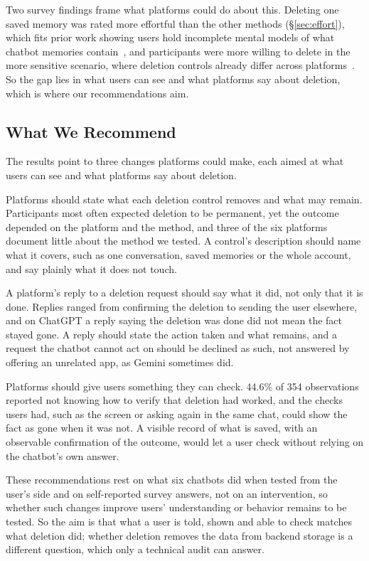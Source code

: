 \documentclass[conference,compsoc]{IEEEtran}
\begin{document}
Two survey findings frame what platforms could do about this.
Deleting one saved memory was rated more effortful than the other methods (\S\ref{sec:effort}), which fits prior work showing users hold incomplete mental models of what chatbot memories contain~\cite{zhang2025understanding}, and participants were more willing to delete in the more sensitive scenario, where deletion controls already differ across platforms~\cite{li2026privacy}.
So the gap lies in what users can see and what platforms say about deletion, which is where our recommendations aim.

\subsection{What We Recommend}
\label{sec:discussion-recommend}
The results point to three changes platforms could make, each aimed at what users can see and what platforms say about deletion.

Platforms should state what each deletion control removes and what may remain.
Participants most often expected deletion to be permanent, yet the outcome depended on the platform and the method, and three of the six platforms document little about the method we tested.
A control's description should name what it covers, such as one conversation, saved memories or the whole account, and say plainly what it does not touch.

A platform's reply to a deletion request should say what it did, not only that it is done.
Replies ranged from confirming the deletion to sending the user elsewhere, and on ChatGPT a reply saying the deletion was done did not mean the fact stayed gone.
A reply should state the action taken and what remains, and a request the chatbot cannot act on should be declined as such, not answered by offering an unrelated app, as Gemini sometimes did.

Platforms should give users something they can check.
44.6\% of 354 observations reported not knowing how to verify that deletion had worked, and the checks users had, such as the screen or asking again in the same chat, could show the fact as gone when it was not.
A visible record of what is saved, with an observable confirmation of the outcome, would let a user check without relying on the chatbot's own answer.

These recommendations rest on what six chatbots did when tested from the user's side and on self-reported survey answers, not on an intervention, so whether such changes improve users' understanding or behavior remains to be tested.
So the aim is that what a user is told, shown and able to check matches what deletion did; whether deletion removes the data from backend storage is a different question, which only a technical audit can answer.
\end{document}
